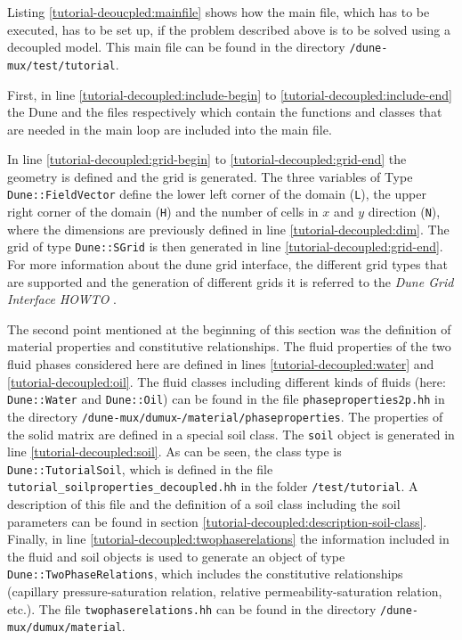 Listing \ref{tutorial-deoucpled:mainfile} shows how the main file, which has to be executed, has to be set up, if the problem described above is to be solved using a decoupled model. This main file can be found in the directory \texttt{/dune-mux/test/tutorial}.

\begin{lst}\label{tutorial-deoucpled:mainfile} \mbox{}

\end{lst}

First, in line \ref{tutorial-decoupled:include-begin} to \ref{tutorial-decoupled:include-end} the Dune and the \Dumux files respectively which contain the functions and classes that are needed in the main loop are included into the main file.

In line \ref{tutorial-decoupled:grid-begin} to \ref{tutorial-decoupled:grid-end} the geometry is defined and the grid is generated. The three variables of Type \texttt{Dune::FieldVector} define the lower left corner of the domain (\texttt{L}), the upper right corner of the domain (\texttt{H}) and the number of cells in $x$ and $y$ direction (\texttt{N}), where the dimensions are previously defined in line \ref{tutorial-decoupled:dim}. The grid of type \texttt{Dune::SGrid} is then generated in line \ref{tutorial-decoupled:grid-end}. For more information about the dune grid interface, the different grid types that are supported and the generation of different grids it is referred to the \textit{Dune Grid Interface HOWTO} \cite{DUNE-HP}.

The second point mentioned at the beginning of this section was the definition of material properties and constitutive relationships. The fluid properties of the two fluid phases considered here are defined in lines \ref{tutorial-decoupled:water} and \ref{tutorial-decoupled:oil}. The fluid classes including different kinds of fluids (here: \texttt{Dune::Water} and \texttt{Dune::Oil}) can be found in the file \texttt{phaseproperties2p.hh} in the directory \texttt{/dune-mux/dumux}-\texttt{/material/phaseproperties}. The properties of the solid matrix are defined in a special soil class. The \texttt{soil} object is generated in line \ref{tutorial-decoupled:soil}. As can be seen, the class type is \texttt{Dune::TutorialSoil}, which is defined in the file \texttt{tutorial\_soilproperties\_decoupled.hh} in the folder \texttt{/test/tutorial}. A description of this file and the definition of a soil class including the soil parameters can be found in section \ref{tutorial-decoupled:description-soil-class}. Finally, in line \ref{tutorial-decoupled:twophaserelations} the information included in the fluid and soil objects is used to generate an object of type \texttt{Dune::TwoPhaseRelations}, which includes the constitutive relationships (capillary pressure-saturation relation, relative permeability-saturation relation, etc.). The file \texttt{twophaserelations.hh} can be found in the directory \texttt{/dune-mux/dumux/material}.

